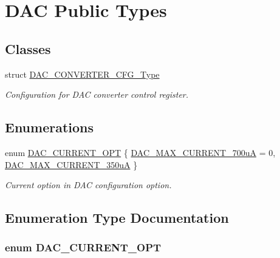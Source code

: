 \hypertarget{group___d_a_c___public___types}{\section{\-D\-A\-C \-Public \-Types}
\label{group___d_a_c___public___types}
}
\subsection*{\-Classes}
\begin{DoxyCompactItemize}
\item 
struct \hyperlink{struct_d_a_c___c_o_n_v_e_r_t_e_r___c_f_g___type}{\-D\-A\-C\-\_\-\-C\-O\-N\-V\-E\-R\-T\-E\-R\-\_\-\-C\-F\-G\-\_\-\-Type}
\begin{DoxyCompactList}\small\item\em \-Configuration for \-D\-A\-C converter control register. \end{DoxyCompactList}\end{DoxyCompactItemize}
\subsection*{\-Enumerations}
\begin{DoxyCompactItemize}
\item 
enum \hyperlink{group___d_a_c___public___types_ga1edc677e8a001419dc8524cb90ebff0d}{\-D\-A\-C\-\_\-\-C\-U\-R\-R\-E\-N\-T\-\_\-\-O\-P\-T} \{ \hyperlink{group___d_a_c___public___types_gga1edc677e8a001419dc8524cb90ebff0da56729894b1f087f016bbdaea074bb4ad}{\-D\-A\-C\-\_\-\-M\-A\-X\-\_\-\-C\-U\-R\-R\-E\-N\-T\-\_\-700u\-A} =  0, 
\hyperlink{group___d_a_c___public___types_gga1edc677e8a001419dc8524cb90ebff0dafb385583bac066ed6edcecc7d8ba1c31}{\-D\-A\-C\-\_\-\-M\-A\-X\-\_\-\-C\-U\-R\-R\-E\-N\-T\-\_\-350u\-A}
 \}
\begin{DoxyCompactList}\small\item\em \-Current option in \-D\-A\-C configuration option. \end{DoxyCompactList}\end{DoxyCompactItemize}


\subsection{\-Enumeration \-Type \-Documentation}
\hypertarget{group___d_a_c___public___types_ga1edc677e8a001419dc8524cb90ebff0d}{
\subsubsection[{\-D\-A\-C\-\_\-\-C\-U\-R\-R\-E\-N\-T\-\_\-\-O\-P\-T}]{\setlength{\rightskip}{0pt plus 5cm}enum {\bf \-D\-A\-C\-\_\-\-C\-U\-R\-R\-E\-N\-T\-\_\-\-O\-P\-T}}}\label{group___d_a_c___public___types_ga1edc677e8a001419dc8524cb90ebff0d}


